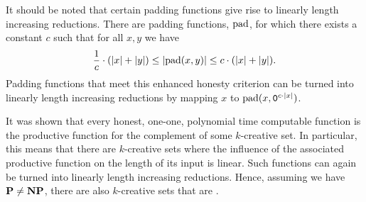It should be noted that certain padding functions give rise to linearly length increasing reductions.
There are padding functions, $\operatorname{pad}$, for which there exists a constant $c$ such that for all $x, y$ we have
\begin{equation*}
  \frac{1}{c} \cdot ({\lvert x\rvert} + {\lvert y\rvert}) \le {\lvert\operatorname{pad}(x, y)\rvert} \le c \cdot ({\lvert x\rvert} + {\lvert y\rvert}).
\end{equation*}
Padding functions that meet this enhanced honesty criterion can be turned into linearly length increasing reductions by mapping $x$ to $\operatorname{pad}(x, \textnormal{\texttt{0}}^{c \cdot {\lvert x\rvert}})$.

It was shown \parencite{young1983some} that every honest, one-one, polynomial time computable function is the productive function for the complement of some $k$-creative set.
In particular, this means that there are $k$-creative sets where the influence of the associated productive function on the length of its input is linear.
Such functions can again be turned into linearly length increasing reductions.
Hence, assuming we have $\textnormal{\textbf{P}} \ne \textnormal{\textbf{NP}}$, there are also $k$-creative sets that are .

